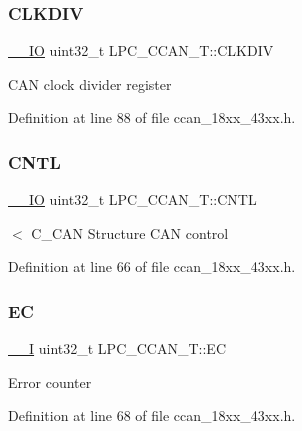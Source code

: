 \subsubsection{\texorpdfstring{C\+L\+K\+D\+IV}{CLKDIV}}
{\footnotesize\ttfamily \hyperlink{core__sc300_8h_aec43007d9998a0a0e01faede4133d6be}{\+\_\+\+\_\+\+IO} uint32\+\_\+t L\+P\+C\+\_\+\+C\+C\+A\+N\+\_\+\+T\+::\+C\+L\+K\+D\+IV}

C\+AN clock divider register 

Definition at line 88 of file ccan\+\_\+18xx\+\_\+43xx.\+h.

\mbox{\label{struct_l_p_c___c_c_a_n___t_aa5319ff95847e9488ae2790a69e7640b}} 
\subsubsection{\texorpdfstring{C\+N\+TL}{CNTL}}
{\footnotesize\ttfamily \hyperlink{core__sc300_8h_aec43007d9998a0a0e01faede4133d6be}{\+\_\+\+\_\+\+IO} uint32\+\_\+t L\+P\+C\+\_\+\+C\+C\+A\+N\+\_\+\+T\+::\+C\+N\+TL}

$<$ C\+\_\+\+C\+AN Structure C\+AN control 

Definition at line 66 of file ccan\+\_\+18xx\+\_\+43xx.\+h.

\mbox{\label{struct_l_p_c___c_c_a_n___t_a35c04f2f27efece2a547b3ca832bd1a9}} 
\subsubsection{\texorpdfstring{EC}{EC}}
{\footnotesize\ttfamily \hyperlink{core__sc300_8h_af63697ed9952cc71e1225efe205f6cd3}{\+\_\+\+\_\+I} uint32\+\_\+t L\+P\+C\+\_\+\+C\+C\+A\+N\+\_\+\+T\+::\+EC}

Error counter 

Definition at line 68 of file ccan\+\_\+18xx\+\_\+43xx.\+h.

\mbox{\label{struct_l_p_c___c_c_a_n___t_ac8cb88fa72e304a22587de8d993a2dbf}} 
